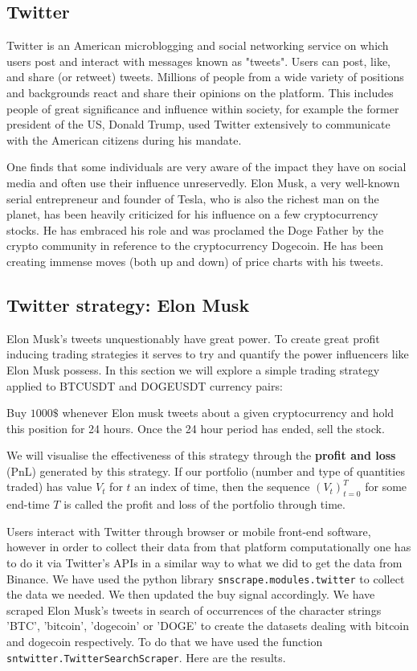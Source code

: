 \documentclass[twoside]{report}
\newcommand{\code}{\texttt}
\begin{document}
\begin{spacing}{1}
\section{Twitter}
Twitter is an American microblogging and social networking service on which users post and interact with messages known as "tweets". Users can post, like, and share (or retweet) tweets. Millions of people from a wide variety of positions and backgrounds react and share their opinions on the platform. This includes people of great significance  and influence within society, for example the former president of the US, Donald Trump, used Twitter extensively to communicate with the American citizens during his mandate.

One finds that some individuals are very aware of the impact they have on social media and often use their influence unreservedly. Elon Musk, a very well-known serial entrepreneur and founder of Tesla, who is also the richest man on the planet, has been heavily criticized for his influence on a few cryptocurrency stocks. He has embraced his role and was proclamed the Doge Father by the crypto community in reference to the cryptocurrency Dogecoin. He has been creating immense moves (both up and down) of price charts with his tweets.

\subsection{Twitter strategy: Elon Musk}
Elon Musk's tweets unquestionably have great power. To create great profit inducing trading strategies it serves to try and quantify the power influencers like Elon Musk possess. In this section we will explore a simple trading strategy applied to BTCUSDT and DOGEUSDT currency pairs: \begin{strategy}
Buy $1000\text{\$}$ whenever Elon musk tweets about a given cryptocurrency and hold this position for 24 hours. Once the 24 hour period has ended, sell the stock.
\end{strategy}\label{strat:musk} 
We will visualise the effectiveness of this strategy through the \textbf{profit and loss} (PnL) generated by this strategy. If our portfolio (number and type of quantities traded) has value $V_t$ for $t$ an index of time, then the sequence $(V_t)_{t=0}^T$ for some end-time $T$ is called the profit and loss of the portfolio through time.

Users interact with Twitter through browser or mobile front-end software, however in order to collect their data from that platform computationally one has to do it via Twitter's APIs in a similar way to what we did to get the data from Binance.
We have used the python library \code{snscrape.modules.twitter} to collect the data we needed. We then updated the buy signal accordingly. We have scraped Elon Musk's tweets in search of occurrences of the character strings 'BTC', 'bitcoin', 'dogecoin' or 'DOGE' to create the datasets dealing with bitcoin and dogecoin respectively. To do that we have used the function \code{sntwitter.TwitterSearchScraper}. Here are the results. 


\end{spacing}
\end{document}
